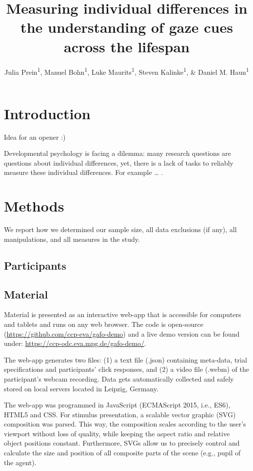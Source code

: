 \documentclass[
  english,
  man,floatsintext]{apa6}
\title{Measuring individual differences in the understanding of gaze cues across the lifespan}
\author{Julia Prein\textsuperscript{1}, Manuel Bohn\textsuperscript{1}, Luke Maurits\textsuperscript{1}, Steven Kalinke\textsuperscript{1}, \& Daniel M. Haun\textsuperscript{1}}
\date{}
\affiliation{\vspace{0.5cm}\textsuperscript{1} Department of Comparative Cultural Psychology, Max Planck Institute for Evolutionary Anthropology, Leipzig, Germany}
\begin{document}
\maketitle

\hypertarget{introduction}{%
\section{Introduction}\label{introduction}}

Idea for an opener :)

Developmental psychology is facing a dilemma: many research questions are questions about individual differences, yet, there is a lack of tasks to reliably measure these individual differences. For example \ldots{} .

\hypertarget{methods}{%
\section{Methods}\label{methods}}

We report how we determined our sample size, all data exclusions (if any), all manipulations, and all measures in the study.

\hypertarget{participants}{%
\subsection{Participants}\label{participants}}

\hypertarget{material}{%
\subsection{Material}\label{material}}

Material is presented as an interactive web-app that is accessible for computers and tablets and runs on any web browser. The code is open-source (\url{https://github.com/ccp-eva/gafo-demo}) and a live demo version can be found under: \url{https://ccp-odc.eva.mpg.de/gafo-demo/}.

The web-app generates two files: (1) a text file (.json) containing meta-data, trial specifications and participants' click responses, and (2) a video file (.webm) of the participant's webcam recording. Data gets automatically collected and safely stored on local servers located in Leipzig, Germany.

The web-app was programmed in JavaScript (ECMAScript 2015, i.e., ES6), HTML5 and CSS. For stimulus presentation, a scalable vector graphic (SVG) composition was parsed. This way, the composition scales according to the user's viewport without loss of quality, while keeping the aspect ratio and relative object positions constant. Furthermore, SVGs allow us to precisely control and calculate the size and position of all composite parts of the scene (e.g., pupil of the agent).
\end{document}
